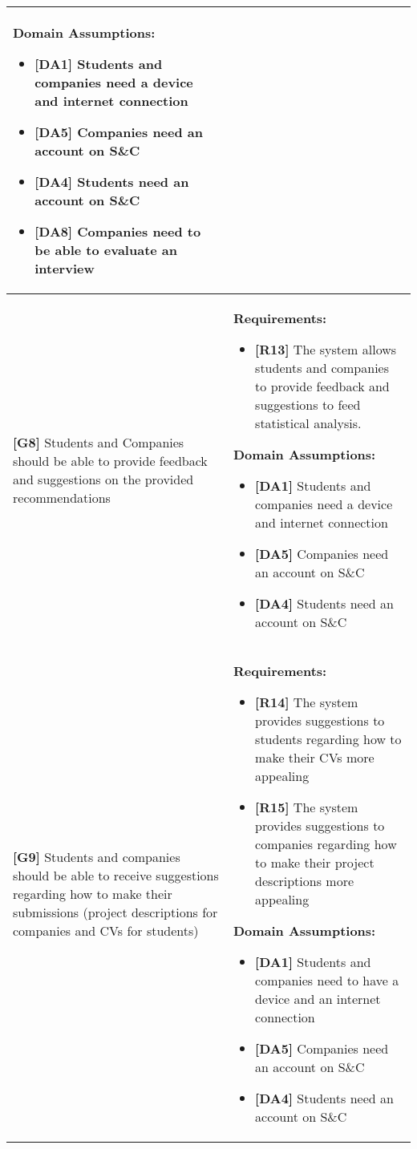 \begin{longtable}{|p{}|p{}|}
\begin{itemize}
\end{itemize}
\textbf{Domain Assumptions:}
\begin{itemize}
    \item \textbf{[DA1]} Students and companies need a device and internet connection
    \item \textbf{[DA5]} Companies need an account on S\&C
    \item \textbf{[DA4]} Students need an account on S\&C
    \item \textbf{[DA8]} Companies need to be able to evaluate an interview
\end{itemize} \\
\hline
\textbf{[G8]} Students and Companies should be able to provide feedback and suggestions on the provided recommendations
& 
\textbf{Requirements:}
\begin{itemize}
    \item \textbf{[R13]} The system allows students and companies to provide feedback and suggestions to feed statistical analysis.
\end{itemize}
\textbf{Domain Assumptions:}
\begin{itemize}
    \item \textbf{[DA1]} Students and companies need a device and internet connection
    \item \textbf{[DA5]} Companies need an account on S\&C
    \item \textbf{[DA4]} Students need an account on S\&C
\end{itemize} \\
\hline
\textbf{[G9]} Students and companies should be able to receive suggestions regarding how to make their submissions (project descriptions for companies and CVs for students)
& 
\textbf{Requirements:}
\begin{itemize}
    \item \textbf{[R14]} The system provides suggestions to students regarding how to make their CVs more appealing
    \item \textbf{[R15]} The system provides suggestions to companies regarding how to make their project descriptions more appealing
\end{itemize}
\textbf{Domain Assumptions:}
\begin{itemize}
    \item \textbf{[DA1]} Students and companies need to have a device and an internet connection
    \item \textbf{[DA5]} Companies need an account on S\&C
    \item \textbf{[DA4]} Students need an account on S\&C

\end{itemize}
\end{longtable}
